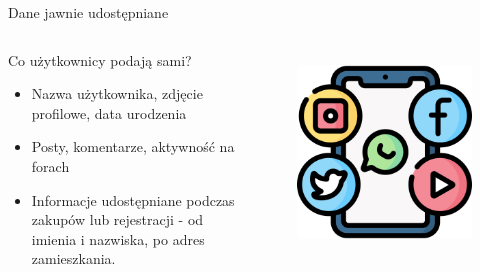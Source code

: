   
  \begin{frame}{Dane jawnie udostępniane}
  \begin{columns}[c]
      \begin{alertblock}{Co użytkownicy podają sami?}
        \begin{itemize}
          \item Nazwa użytkownika, zdjęcie profilowe, data urodzenia
          \item Posty, komentarze, aktywność na forach
          \item Informacje udostępniane podczas zakupów lub rejestracji - od imienia i nazwiska, po adres zamieszkania.\cite{CYB_DEF_NAJCZĘSTRZE_DANE}
        \end{itemize}
      \end{alertblock}
      \begin{figure}
        \centering
        \includegraphics[height=0.45\textheight]{images/social-media.png}
        \label{fig:social-media}
      \end{figure}
  \end{columns}
  \end{frame}
  
